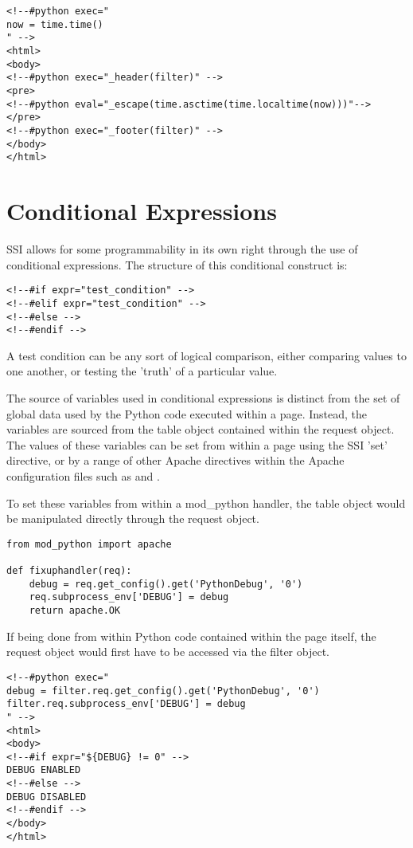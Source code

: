 \begin{verbatim}
<!--#python exec="
now = time.time()
" -->
<html>
<body>
<!--#python exec="_header(filter)" -->
<pre>
<!--#python eval="_escape(time.asctime(time.localtime(now)))"-->
</pre>
<!--#python exec="_footer(filter)" -->
</body>
</html>
\end{verbatim}

\section{Conditional Expressions\label{ssi-conditionals}}

SSI allows for some programmability in its own right through the use of
conditional expressions. The structure of this conditional construct is:

\begin{verbatim}
<!--#if expr="test_condition" -->
<!--#elif expr="test_condition" -->
<!--#else -->
<!--#endif -->
\end{verbatim}

A test condition can be any sort of logical comparison, either comparing
values to one another, or testing the 'truth' of a particular value.

The source of variables used in conditional expressions is distinct from
the set of global data used by the Python code executed within a page.
Instead, the variables are sourced from the  table
object contained within the request object. The values of these variables
can be set from within a page using the SSI 'set' directive, or by a range
of other Apache directives within the Apache configuration files such as
 and .

To set these variables from within a mod_python handler, the
 table object would be manipulated directly through
the request object.

\begin{verbatim}
from mod_python import apache

def fixuphandler(req):
    debug = req.get_config().get('PythonDebug', '0')
    req.subprocess_env['DEBUG'] = debug
    return apache.OK
\end{verbatim}

If being done from within Python code contained within the page itself, the
request object would first have to be accessed via the filter object.

\begin{verbatim}
<!--#python exec="
debug = filter.req.get_config().get('PythonDebug', '0')
filter.req.subprocess_env['DEBUG'] = debug
" -->
<html>
<body>
<!--#if expr="${DEBUG} != 0" -->
DEBUG ENABLED
<!--#else -->
DEBUG DISABLED
<!--#endif -->
</body>
</html>
\end{verbatim}

